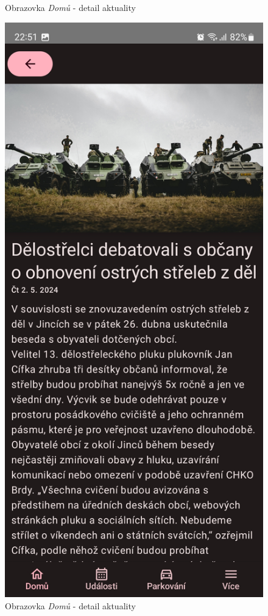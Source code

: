 \begin{figure}[H]
    \caption{Obrazovka \textit{Domů} - detail aktuality}
  \endminipage\hfill
    \includegraphics[width=\linewidth]{screens/1b_B.jpg}
    \caption{Obrazovka \textit{Domů} - detail aktuality}
  \endminipage\hfill
\end{figure}

